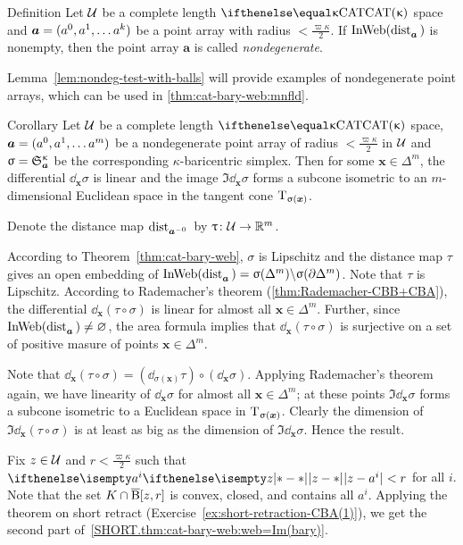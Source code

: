 \begin{thm}{Definition}
Let $\mathcal{U}$ be a complete length $\CAT\kappa$ space
and $\bm{a}\z=(a^0,a^1,\dots a^\kay)$ be a point array with radius $<\tfrac{\varpi\kappa}{2}$.
If $\mathop{\rm InWeb}\nolimits(\mathop{\rm dist}\nolimits_{\bm{a}}^{{}}{}{})$ is nonempty, then the point array $\bm{a}$ is called \emph{nondegenerate}.
\end{thm}

Lemma~\ref{lem:nondeg-test-with-balls} will provide examples of nondegenerate point arrays,
which can be used in \ref{thm:cat-bary-web:mnfld}.

\begin{thm}{Corollary}\label{cor:LinDim>bary}
Let $\mathcal{U}$ be a complete length $\CAT\kappa$ space,
$\bm{a}\z=(a^0,a^1,\dots a^m)$ be a nondegenerate point array 
of radius $<\tfrac{\varpi\kappa}{2}$ in $\mathcal{U}$
and $\upsigma=\mathfrak{S}_{\bm{a}}^{\upkappa}$ be the corresponding $\kappa$-baricentric simplex.
Then for some $\bm{x}\in \Delta^m$,
the differential $\dd_{\bm{x}}\sigma$ is linear 
and the image $\Im\dd_{\bm{x}}\sigma$
forms a subcone isometric to an $m$-dimensional Euclidean space in the tangent cone $\text{\rm T}_{\upsigma(\bm{x})}$.
\end{thm}


Denote the distance map $\mathop{\rm dist}\nolimits_{\bm{a}^{{-} 0}}^{{}}{}{}$ by $\tau\:\spc{U}\to\RR^m$.

According to Theorem~\ref{thm:cat-bary-web},
$\sigma$ is Lipschitz
and the distance map $\tau$ 
gives an open embedding of 
$\mathop{\rm InWeb}\nolimits(\mathop{\rm dist}\nolimits_{\bm{a}}^{{}}{}{})=\upsigma(\Delta^m)\backslash\upsigma(\partial\Delta^m)$.
Note that $\tau$ is Lipschitz.
According to Rademacher's theorem (\ref{thm:Rademacher-CBB+CBA}), 
the differential 
$\dd_{\bm{x}}(\tau\circ\sigma)$
is linear for almost all $\bm{x}\in\Delta^m$.
Further, since $\InWeb(\distfun{\bm{a}}{}{})\z\ne\emptyset$,
the area formula \cite{karmanova} implies that $\dd_{\bm{x}}(\tau\circ\sigma)$ is surjective on a set of positive masure of points $\bm{x}\in\Delta^m$.

Note that $\dd_{\bm{x}}(\tau\circ\sigma)=(\dd_{\sigma(\bm{x})}\tau)\circ(\dd_{\bm{x}}\sigma)$.
Applying Rademacher's theorem again, we have linearity of 
$\dd_{\bm{x}}\sigma$ for almost all $\bm{x}\in\Delta^m$;
at these points $\Im\dd_{\bm{x}}\sigma$ forms a subcone isometric to a Euclidean space in $\text{\rm T}_{\upsigma(\bm{x})}$.
Clearly the dimension of $\Im\dd_{\bm{x}}(\tau\circ\sigma)$ is at least as big as the dimension of $\Im\dd_{\bm{x}}\sigma$.
Hence the result.
\qeds


Fix $z\in\spc{U}$ and $r<\tfrac{\varpi\kappa}2$
such that $\dist{z}{a^i}{}<r$ for all $i$.
Note that the set $K\cap \cBall[z,r]$ is convex, closed, and contains all $a^i$.
Applying the theorem on short retract (Exercise~\ref{ex:short-retraction-CBA(1)}),
we get the second part of~\ref{SHORT.thm:cat-bary-web:web=Im(bary)}.

